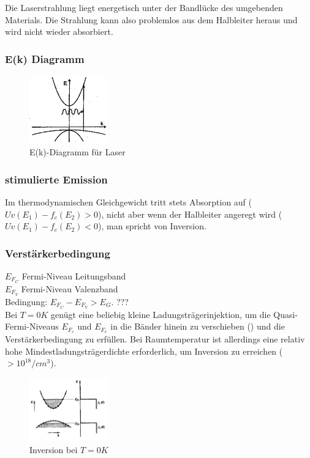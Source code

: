 \documentclass{article}
\begin{document}
    Die Laserstrahlung liegt energetisch unter der Bandlücke des umgebenden Materials. Die Strahlung kann also problemlos aus dem Halbleiter heraus und wird nicht wieder absorbiert.
    \subsubsection{E(k) Diagramm}
        \begin{figure}[H]
            \centering
            \includegraphics[width=0.3\textwidth]{fig/ekLaser}
            \caption{E(k)-Diagramm f\"ur Laser}
            \label{fig:ekLaser}
        \end{figure}
    \subsubsection{stimulierte Emission}
    Im thermodynamischen Gleichgewicht tritt stets Absorption auf ($Uv(E_1)-f_c(E_2) > 0$), nicht aber wenn der Halbleiter angeregt wird ($Uv(E_1)-f_c(E_2) < 0$), man spricht von Inversion.
    \subsubsection{Verst\"arkerbedingung}
    $E_{F_C}$ Fermi-Niveau Leitungsband\\
    $E_{F_V}$ Fermi-Niveau Valenzband\\
    Bedingung: $E_{F_C} - E_{F_V} > E_G$. ???\\
    Bei $T=0K$ genügt eine beliebig kleine Ladungsträgerinjektion, um die Quasi-Fermi-Niveaus $E_{F_c}$ und $E_{F_v}$ in die Bänder hinein zu verschieben () und die Verstärkerbedingung zu erfüllen. Bei Raumtemperatur ist allerdings eine relativ hohe Mindestladungsträgerdichte erforderlich, um Inversion zu erreichen ($ > 10^{18}/cm^3$).
        \begin{figure}[H]
            \centering
            \includegraphics[width=0.3\textwidth]{fig/inversionLaser}
            \caption{Inversion bei $T=0K$}
            \label{fig:invLaser}
        \end{figure}
\end{document}
